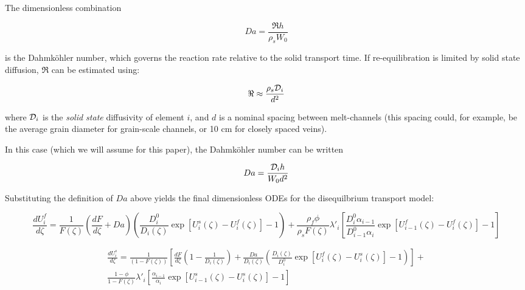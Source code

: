 \documentclass[draft]{agujournal2019}
\begin{document}
The dimensionless combination

\begin{linenomath*}
\begin{equation}
    Da = \frac{\Re h}{\rho_s W_0}\label{eq:50}
\end{equation}
\end{linenomath*}

is the Dahmköhler number, which governs the reaction rate relative to the solid transport time. If re-equilibration is limited by solid state diffusion, $\Re$ can be estimated using:

\begin{linenomath*}
\begin{equation}
    \Re \approx \frac{\rho_s{\cal D}_i}{d^2}\label{eq:51}
\end{equation}
\end{linenomath*}

where ${\cal D}_i$ is the \textit{solid state} diffusivity of element $i$, and $d$ is a nominal spacing between melt-channels (this spacing could, for example, be the average grain diameter for grain-scale channels, or 10 cm for closely spaced veins). 

In this case (which we will assume for this paper),  the Dahmköhler number can be written

\begin{linenomath*}
\begin{equation}
    Da = \frac{{\cal D}_i h}{W_0 d^2}\label{eq:52}
\end{equation}
\end{linenomath*}

Substituting the definition of $Da$ above yields the final dimensionless ODEs for the disequilbrium transport model:

\begin{linenomath*}
\begin{equation}
    \frac{dU_i^f}{d\zeta} = \frac{1}{F(\zeta)}\left(\frac{dF}{d\zeta} + Da\right)\left(\frac{D_i^0}{D_i(\zeta)}\exp[U_i^s(\zeta) - U_i^f(\zeta)] - 1\right) + \frac{\rho_f \phi}{\rho_s F(\zeta)}\lambda'_i \left[\frac{D_i^0 \alpha_{i-1}}{D_{i-1}^0 \alpha_i} \exp[U_{i-1}^f(\zeta) - U_i^f(\zeta)]-1\right]\label{eq:53}
\end{equation}
\end{linenomath*}

\begin{linenomath*}
\begin{equation}\label{eq:54}
    \begin{aligned}
    	\frac{dU_i^s}{d\zeta} = \frac{1}{(1 - F(\zeta))}\left[\frac{dF}{d\zeta} \left(1 - \frac{1}{D_i(\zeta)}\right)+ \frac{Da}{D_i(\zeta)}\left(\frac{D_i(\zeta)}{D_i^0}\exp[U_i^f(\zeta) - U_i^s(\zeta)] - 1\right) \right]+ \\
	\frac{1-\phi}{1-F(\zeta)}\lambda'_i \left[\frac{\alpha_{i-1}}{\alpha_i} \exp[U_{i-1}^s(\zeta) - U_i^s(\zeta)]-1\right]
    \end{aligned}
\end{equation}
\end{linenomath*}
\end{document}
